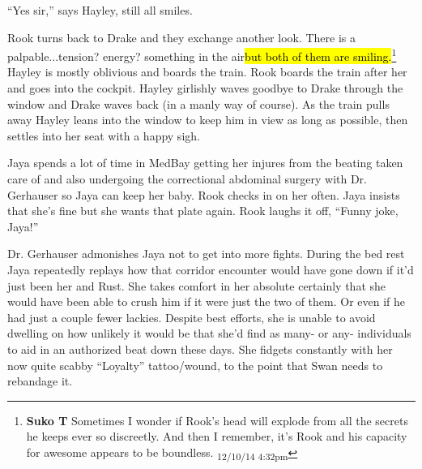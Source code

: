 ``Yes sir,'' says Hayley, still all smiles.

Rook turns back to Drake and they exchange another look.  There is a palpable...tension? energy? something in the air\hl{but both of them are smiling.}\footnote{\textbf{Suko T }Sometimes I wonder if Rook's head will explode from all the secrets he keeps ever so discreetly. And then I remember, it's Rook and his capacity for awesome appears to be boundless. \textsubscript{12/10/14 4:32pm}}  Hayley is mostly oblivious and boards the train.  Rook boards the train after her and goes into the cockpit.  Hayley girlishly waves goodbye to Drake through the window and Drake waves back (in a manly way of course).  As the train pulls away Hayley leans into the window to keep him in view as long as possible, then settles into her seat with a happy sigh.





Jaya spends a lot of time in MedBay getting her injures from the beating taken care of and also undergoing the correctional abdominal surgery with Dr. Gerhauser so Jaya can keep her baby.  Rook checks in on her often.  Jaya insists that she's fine but she wants that plate again.  Rook laughs it off, ``Funny joke, Jaya!''



Dr. Gerhauser admonishes Jaya not to get into more fights.  During the bed rest Jaya repeatedly replays how that corridor encounter would have gone down if it'd just been her and Rust.  She takes comfort in her absolute certainly that she would have been able to crush him if it were just the two of them.  Or even if he had just a couple fewer lackies.  Despite best efforts, she is unable to avoid dwelling on how unlikely it would be that she'd find as many- or any- individuals to aid in an authorized beat down these days. She fidgets constantly with her now quite scabby ``Loyalty'' tattoo/wound, to the point that Swan needs to rebandage it. 



